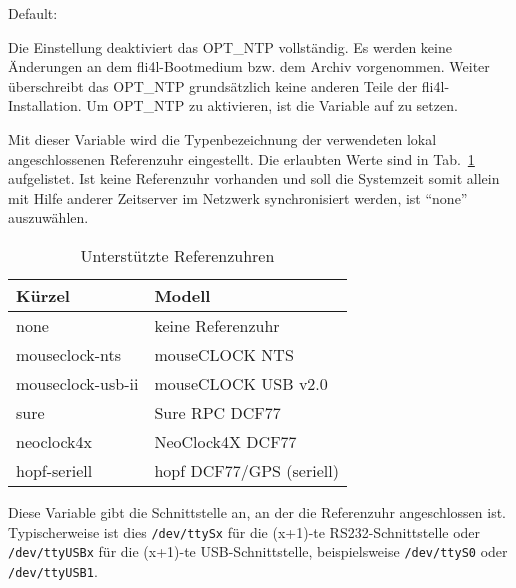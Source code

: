 \begin{description}


  {Default: 

  Die Einstellung  deaktiviert das OPT\_NTP vollständig. Es werden
  keine Änderungen an dem fli4l-Bootmedium bzw. dem Archiv 
  vorgenommen. Weiter überschreibt das OPT\_NTP grundsätzlich keine anderen
  Teile der fli4l-Installation.
  Um OPT\_NTP zu aktivieren, ist die Variable  auf 
   zu setzen.}


  Mit dieser Variable wird die Typenbezeichnung der verwendeten lokal
  angeschlossenen Referenzuhr eingestellt. Die erlaubten Werte sind in
  Tab.~\ref{table:ntp:refclocks} aufgelistet. Ist keine Referenzuhr vorhanden
  und soll die Systemzeit somit allein mit Hilfe anderer Zeitserver im Netzwerk
  synchronisiert werden, ist ``none'' auszuwählen.

  \begin{table}[ht!]
    \centering
    \small
    \caption{Unterstützte Referenzuhren}
    \label{table:ntp:refclocks}
    \begin{tabular}{|l|p{7.5cm}|}
      \hline
      Kürzel & Modell \\
      \hline
      none              & keine Referenzuhr \\
      mouseclock-nts    & mouseCLOCK NTS \\
      mouseclock-usb-ii & mouseCLOCK USB v2.0\\
      sure              & Sure RPC DCF77 \\
      neoclock4x        & NeoClock4X DCF77 \\
      hopf-seriell      & hopf DCF77/GPS (seriell) \\
      \hline
    \end{tabular}
  \end{table}


  Diese Variable gibt die Schnittstelle an, an der die Referenzuhr
  angeschlossen ist. Typischerweise ist dies \texttt{/dev/ttySx} für die
  (x+1)-te RS232-Schnittstelle oder \texttt{/dev/ttyUSBx} für die (x+1)-te
  USB-Schnittstelle, beispielsweise \texttt{/dev/ttyS0} oder
  \texttt{/dev/ttyUSB1}.


\end{description}
